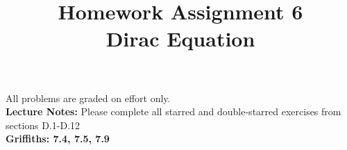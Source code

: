 \documentclass[12pt]{article}
\begin{document}
\date{\vspace{-5ex}}

\title{Homework Assignment 6 \\ Dirac Equation }

\maketitle

\noindent
All problems are graded on effort only.\\

\noindent
{\bf Lecture Notes:} Please complete all starred and double-starred
exercises from sections D.1-D.12\\

\noindent
{\bf Griffiths: 7.4, 7.5, 7.9}\\[5pt]
\end{document}
